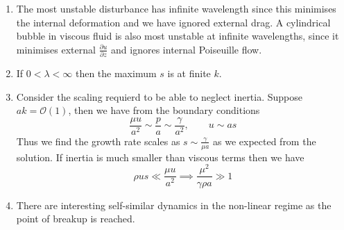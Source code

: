 \documentclass{jknotes}
\begin{document}
\begin{center}
\end{center}

\begin{enumerate}
	\item The most unstable disturbance has infinite wavelength since this
		minimises the internal deformation and we have ignored external drag.
		A cylindrical bubble in viscous fluid is also most unstable at
		infinite wavelengths, since it minimises external $\frac{\partial
		u}{\partial z}$ and ignores internal Poiseuille flow.
	\item If $0 < \lambda < \infty$ then the maximum $s$ is at finite $k$.
	\begin{center}
		\end{center}
	\item Consider the scaling requierd to be able to neglect inertia. Suppose
		$ak = \mathcal{O}(1)$, then we have from the boundary conditions
		\begin{equation}
			\frac{\mu u}{a^2} \sim \frac{p}{a} \sim \frac{\gamma}{a^2},
			\hspace{2em} u \sim as 
		\end{equation}
		Thus we find the growth rate scales as $s \sim \frac{\gamma}{\mu a}$
		as we expected from the solution. If inertia is much smaller than
		viscous terms then we have
		\begin{equation}
			\rho u s \ll \frac{\mu u}{a^2} \implies \frac{\mu ^2}{\gamma \rho
			a} \gg 1
		\end{equation}
	\item There are interesting self-similar dynamics in the non-linear regime
		as the point of breakup is reached.
\end{enumerate}
\end{document}
